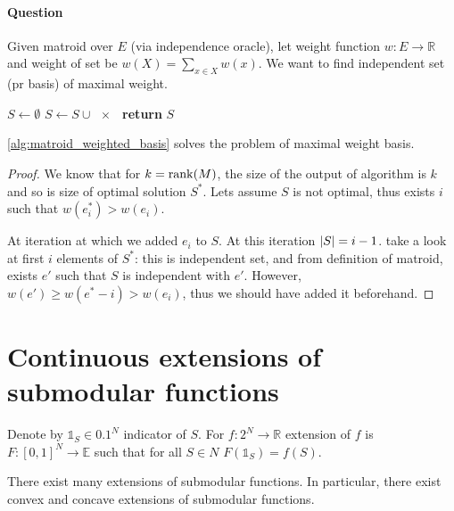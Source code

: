 \paragraph{Question} Given matroid over $E$ (via independence oracle), let weight function $w: E\to \mathbb{R}$ and weight of set be $w(X) = \sum_{x\in X} w(x)$. We want to find independent set (pr basis) of maximal weight.


\begin{algorithm}
	\caption{}\label{alg:matroid_weighted_basis}
	\begin{algorithmic}[1]
		\State $S \gets \emptyset$
		\State $S\gets S\cup \qty{x}$
		\EndIf
		\EndFor
		\State \textbf{return} $S$
		\EndProcedure
	\end{algorithmic}
\end{algorithm}
\begin{prop}
	\vref{alg:matroid_weighted_basis} solves the problem of maximal weight basis.
	\begin{proof}
		We know that for $k = \rank(M)$, the size of the output of algorithm is $k$ and so is size of optimal solution $S^*$.
		Lets assume $S$ is not optimal, thus exists $i$ such that $w(e_i^*) > w(e_i)$.
		
		At iteration at which we added $e_i$ to $S$. At this iteration $\abs{S}=i-1$. take a look at first $i$ elements of $S^*$: this is independent set, and from definition of matroid, exists $e'$ such that $S$ is independent with $e'$. However, $w(e') \geq w(e^*-i) > w(e_i)$, thus we should have added it beforehand.
	\end{proof}
\end{prop}

\section{Continuous extensions of submodular functions} 
\begin{definition}
	Denote by $\mathds{1}_S \in \qty{0,1}^N$ indicator of $S$. For $f: 2^N \to \mathbb{R}$ extension of $f$ is $F: [0,1]^N \to \mathbb{E}$ such that for all $S\in N$ $F(\mathds{1}_S) = f(S)$.
\end{definition}

There exist many extensions of submodular functions. In particular, there exist convex and concave extensions of submodular functions. 